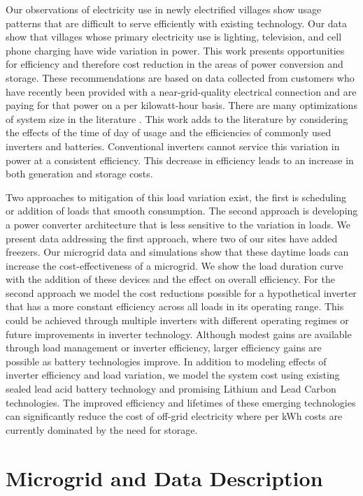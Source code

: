 \documentclass[conference]{IEEEtran}
\begin{document}
Our observations of electricity use in newly electrified villages
show usage patterns that are difficult to serve efficiently 
with existing technology.
Our data show that villages whose primary electricity use is 
lighting, television, and cell phone charging have wide variation
in power.
This work presents opportunities for efficiency and therefore
cost reduction in the areas of power conversion and storage.
These recommendations are based on data collected from customers
who have recently been provided with a near-grid-quality
electrical connection and are paying for that power on a
per kilowatt-hour basis.
There are many optimizations of system size in the literature
\cite{optimizations}.
This work adds to the literature by considering the effects
of the time of day of usage and the efficiencies of commonly
used inverters and batteries.
Conventional inverters cannot service this variation in power
at a consistent efficiency.
This decrease in efficiency leads to an increase in both
generation and storage costs.

Two approaches to mitigation of this load variation exist, 
the first is scheduling or addition of loads that smooth consumption.
The second approach is developing a power converter architecture
that is less sensitive to the variation in loads.
We present data addressing the first approach, where two of our 
sites have added freezers.
Our microgrid data and simulations show that these daytime loads
can increase the cost-effectiveness of a microgrid.
We show the load duration curve with the addition of these 
devices and the effect on overall efficiency.
For the second approach we model the cost reductions possible
for a hypothetical inverter that has a more constant efficiency
across all loads in its operating range.
This could be achieved through multiple inverters with 
different operating regimes or future improvements in inverter
technology.
Although modest gains are available through load management or 
inverter efficiency, larger efficiency
gains are possible as battery technologies improve.
In addition to modeling effects of inverter efficiency and load 
variation, we model the system cost using existing sealed lead acid 
battery technology and promising Lithium and Lead Carbon
technologies.
The improved efficiency and lifetimes of these emerging technologies
can significantly reduce the cost of off-grid electricity
where per kWh costs are currently dominated by the need
for storage.


\section{Microgrid and Data Description}
\end{document}
